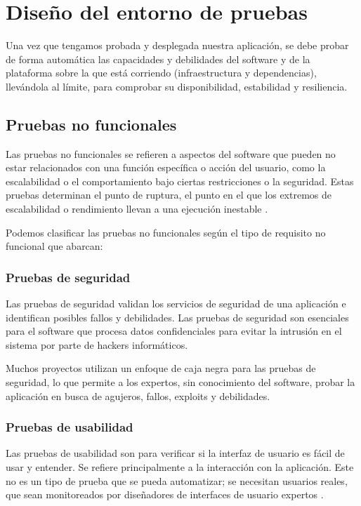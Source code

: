 \section{Diseño del entorno de pruebas}

Una vez que tengamos probada y desplegada nuestra aplicación, se debe probar de forma automática las capacidades y debilidades del software y de la plataforma sobre la que está corriendo (infraestructura y dependencias), llevándola al límite, para comprobar su disponibilidad, estabilidad y resiliencia.

\subsection{Pruebas no funcionales}

Las pruebas no funcionales se refieren a aspectos del software que pueden no estar relacionados con una función específica o acción del usuario, como la escalabilidad o el comportamiento bajo ciertas restricciones o la seguridad. Estas pruebas determinan el punto de ruptura, el punto en el que los extremos de escalabilidad o rendimiento llevan a una ejecución inestable \cite{test4}.

Podemos clasificar las pruebas no funcionales según el tipo de requisito no funcional que abarcan:

\subsubsection{Pruebas de seguridad}

Las pruebas de seguridad validan los servicios de seguridad de una aplicación e identifican posibles fallos y debilidades. Las pruebas de seguridad son esenciales para el software que procesa datos confidenciales para evitar la intrusión en el sistema por parte de hackers informáticos.

Muchos proyectos utilizan un enfoque de caja negra para las pruebas de seguridad, lo que permite a los expertos, sin conocimiento del software, probar la aplicación en busca de agujeros, fallos, exploits y debilidades.

\subsubsection{Pruebas de usabilidad}

Las pruebas de usabilidad son para verificar si la interfaz de usuario es fácil de usar y entender. Se refiere principalmente a la interacción con la aplicación. Este no es un tipo de prueba que se pueda automatizar; se necesitan usuarios reales, que sean monitoreados por diseñadores de interfaces de usuario expertos \cite{test4}.

